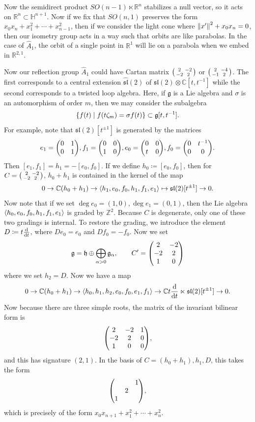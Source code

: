 \documentclass[leqno, openany]{memoir}
\theoremstyle{definition}
\theoremstyle{remark}
\theoremstyle{plain}
\theoremstyle{definition}
\theoremstyle{remark}
\newcommand{\R}{\mathbb{R}}
\newcommand{\C}{\mathbb{C}}
\renewcommand{\H}{\mathbb{H}}
\newcommand{\Z}{\mathbb{Z}}
\newcommand{\mf}[1]{\mathfrak{#1}}
\newcommand{\wh}[1]{\widehat{#1}}
\begin{document}
Now the semidirect product $SO(n-1) \ltimes \R^n$ stabilizes a null vector, so
it acts on $\R^n \subset \H^{n+1}$. Now if we fix that $SO(n,1)$ preserves the
form $x_0 x_n + x_1^2 + \cdots + x_{n-1}^2$, then if we consider the light cone
where $\norm{x'}^2 + x_0 x_n = 0$, then our isometry group acts in a way such
that orbits are like parabolas. In the case of $\wh{A}_1$, the orbit of a
single point in $\R^1$ will lie on a parabola when we embed in $\R^{2,1}$.

Now our reflection group $\wh{A}_1$ could have Cartan matrix
$\begin{psmallmatrix} 2 & -2 \\ -2 & 2 \end{psmallmatrix}$ or
$\begin{psmallmatrix} 2 & -4 \\ -1 & 2 \end{psmallmatrix}$. The first
corresponds to a central extension $\wh{\mf{sl}}(2)$ of $\mf{sl}(2) \otimes
\C[t,t^{-1}]$ while the second corresponds to a twisted loop algebra. Here, if
$\mf{g}$ is a Lie algebra and $\sigma$ is an automorphism of order $m$, then we
may consider the subalgebra \[ \qty{f(t) \mid f(t \zeta_m) = \sigma f(t) }
\subset \mf{g}[t,t^{-1}]. \] For example, note that $\mf{sl}(2)[t^{\pm 1}]$ is
generated by the matrices \[ e_1 = \mqty(0 & 1 \\ 0 & 1), f_1 = \mqty(0 & 0 \\
    1 & 0), e_0 = \mqty(0 & 0 \\ t & 0), f_0 = \mqty(0 & t^{-1} \\ 0 & 0). \]
    Then $[e_1, f_1] = h_1 = -[e_0, f_0]$. If we define $h_0 \coloneqq [e_0,
    f_0]$, then for $C = \begin{psmallmatrix} 2 & -2 \\ -2 & 2
    \end{psmallmatrix}$, $h_0 + h_1$ is contained in the kernel of the map \[ 0
\to \C(h_0 + h_1) \to \ev{h_1, e_0, f_0, h_1, f_1, e_1} \mapsto \mf{sl}(2)
[t^{\pm 1}] \to 0. \] Now note that if we set $\deg e_0 = (1,0), \deg e_1 =
(0,1)$, then the Lie algebra $\ev{h_0, e_0, f_0, h_1, f_1, e_1}$ is graded by
$\Z^2$. Because $C$ is degenerate, only one of these two gradings is internal.
To restore the grading, we introduce the element $D \coloneqq t \dv{t}$, where
$D e_0 = e_0$ and $D f_0 = -f_0$. Now we set \[ \mf{g} = \mf{h} \oplus
    \bigoplus_{\alpha > 0} \mf{g}_{\alpha}, \qquad C' = \mqty(2 & -2 \\ -2 & 2
    \\ 1 & 0) \] where we set $h_2 = D$. Now we have a map \[ 0 \to \C(h_0 +
h_1) \to \ev{h_0, h_1, h_2, e_0, f_0, e_1, f_1} \to \C t \dv{t} \ltimes
\mf{sl}(2)[t^{\pm 1}] \to 0. \] Now because there are three simple roots, the
matrix of the invariant bilinear form is \[ \mqty(2 & -2 & 1 \\ -2 & 2 & 0 \\ 1
& 0 & 0), \] and this has signature $(2,1)$. In the basis of $C=(h_0+h_1), h_1,
D$, this takes the form \[ \mqty( & & 1 \\ & 2 & \\ 1 & & ), \] which is
precisely of the form $x_0 x_{n+1} + x_1^2 + \cdots + x_n^2$.
\end{document}
